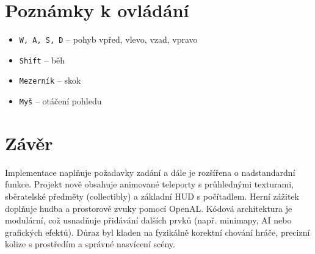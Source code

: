\documentclass[12pt,a4paper]{article}
\begin{document}
\section{Poznámky k ovládání}
\begin{itemize}
    \item \texttt{W, A, S, D} – pohyb vpřed, vlevo, vzad, vpravo
    \item \texttt{Shift} – běh
    \item \texttt{Mezerník} – skok
    \item \texttt{Myš} – otáčení pohledu
\end{itemize}

\section{Závěr}
Implementace naplňuje požadavky zadání a dále je rozšířena o nadstandardní funkce. Projekt nově obsahuje animované teleporty s průhlednými texturami, sběratelské předměty (collectibly) a základní HUD s počítadlem. Herní zážitek doplňuje hudba a prostorové zvuky pomocí OpenAL. Kódová architektura je modulární, což usnadňuje přidávání dalších prvků (např. minimapy, AI nebo grafických efektů). Důraz byl kladen na fyzikálně korektní chování hráče, precizní kolize s prostředím a správné nasvícení scény.
\end{document}
